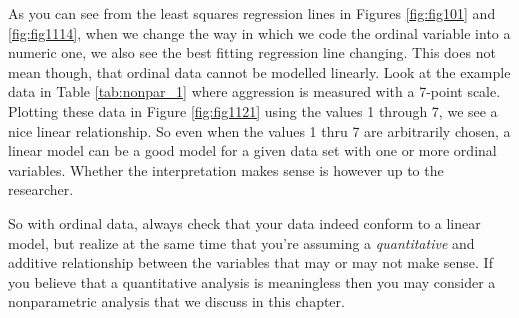 \begin{knitrout}
\color{fgcolor}\begin{kframe}


{\ttfamily\noindent\bfseries{}}\end{kframe}
\end{knitrout}

As you can see from the least squares regression lines in Figures \ref{fig:fig101} and \ref{fig:fig1114}, when we change the way in which we code the ordinal variable into a numeric one, we also see the best fitting regression line changing. This does not mean though, that ordinal data cannot be modelled linearly. Look at the example data in Table \ref{tab:nonpar_1} where aggression is measured with a 7-point scale. Plotting these data in Figure \ref{fig:fig1121} using the values 1 through 7, we see a nice linear relationship. So even when the values 1 thru 7 are arbitrarily chosen, a linear model can be a good model for a given data set with one or more ordinal variables. Whether the interpretation makes sense is however up to the researcher. 


\begin{kframe}


{\ttfamily\noindent\bfseries{}}\end{kframe}


\begin{knitrout}
\color{fgcolor}\begin{kframe}


{\ttfamily\noindent\bfseries{}}\end{kframe}
\end{knitrout}

So with ordinal data, always check that your data indeed conform to a linear model, but realize at the same time that you're assuming a \textit{quantitative} and additive relationship between the variables that may or may not make sense. If you believe that a quantitative analysis is meaningless then you may consider a nonparametric analysis that we discuss in this chapter. 

